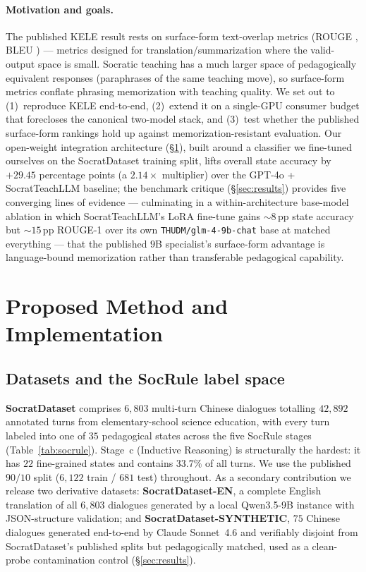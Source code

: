 \documentclass[11pt]{article}
\begin{document}
\paragraph{Motivation and goals.} The published KELE result rests on surface-form text-overlap metrics (ROUGE \citep{lin2004rouge}, BLEU \citep{papineni2002bleu}) — metrics designed for translation/summarization where the valid-output space is small. Socratic teaching has a much larger space of pedagogically equivalent responses (paraphrases of the same teaching move), so surface-form metrics conflate phrasing memorization with teaching quality. We set out to (1)~reproduce KELE end-to-end, (2)~extend it on a single-GPU consumer budget that forecloses the canonical two-model stack, and (3)~test whether the published surface-form rankings hold up against memorization-resistant evaluation. Our open-weight integration architecture (\S\ref{sec:method}), built around a classifier we fine-tuned ourselves on the SocratDataset training split, lifts overall state accuracy by $\mathbf{+29.45}$ percentage points (a $\mathbf{2.14\times}$ multiplier) over the GPT-4o + SocratTeachLLM baseline; the benchmark critique (\S\ref{sec:results}) provides five converging lines of evidence --- culminating in a within-architecture base-model ablation in which SocratTeachLLM's LoRA fine-tune gains $\sim$$8$\,pp state accuracy but $\sim$$15$\,pp ROUGE-1 over its own \texttt{THUDM/glm-4-9b-chat} base at matched everything --- that the published $9$B specialist's surface-form advantage is language-bound memorization rather than transferable pedagogical capability.

\section{Proposed Method and Implementation}
\label{sec:method}

\subsection{Datasets and the SocRule label space}

\textbf{SocratDataset} \citep{peng2025kele} comprises $6{,}803$ multi-turn Chinese dialogues totalling $42{,}892$ annotated turns from elementary-school science education, with every turn labeled into one of $35$ pedagogical states across the five SocRule stages (Table~\ref{tab:socrule}). Stage~c (Inductive Reasoning) is structurally the hardest: it has $22$ fine-grained states and contains $33.7\%$ of all turns. We use the published $90/10$ split ($6{,}122$ train / $681$ test) throughout. As a secondary contribution we release two derivative datasets: \textbf{SocratDataset-EN}, a complete English translation of all $6{,}803$ dialogues generated by a local Qwen3.5-9B instance with JSON-structure validation; and \textbf{SocratDataset-SYNTHETIC}, $75$ Chinese dialogues generated end-to-end by Claude Sonnet~4.6 and verifiably disjoint from SocratDataset's published splits but pedagogically matched, used as a clean-probe contamination control (\S\ref{sec:results}).
\end{document}
